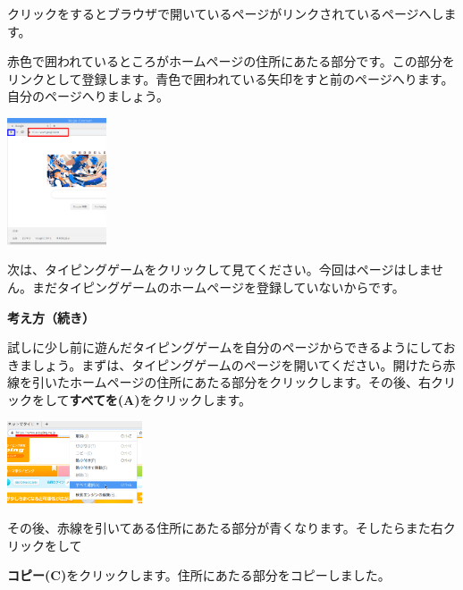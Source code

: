 \flushleft

\bigskip

クリックをするとブラウザで開いているページがリンクされているページへします。

赤色で囲われているところがホームページの住所にあたる部分です。この部分をリンクとして登録します。青色で囲われている矢印をすと前のページへります。自分のページへりましょう。



\bigskip

\centering
\includegraphics[width=0.22\textwidth]{text01-img/textbook-img195.png}

\bigskip

\flushleft
次は、タイピングゲームをクリックして見てください。今回はページはしません。まだタイピングゲームのホームページを登録していないからです。


\clearpage


\textbf{考え方（続き）}



試しに少し前に遊んだタイピングゲームを自分のページからできるようにしておきましょう。まずは、タイピングゲームのページを開いてください。開けたら赤線を引いたホームページの住所にあたる部分をクリックします。その後、右クリックをして\textbf{すべてを(A)}をクリックします。


\bigskip

\centering
\includegraphics[width=0.3\textwidth]{text01-img/textbook-img196.png}

\flushleft

その後、赤線を引いてある住所にあたる部分が青くなります。そしたらまた右クリックをして

\textbf{コピー(C)}をクリックします。住所にあたる部分をコピーしました。

